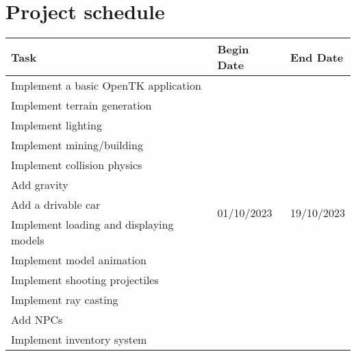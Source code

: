 \section{Project schedule}

\begin{table}[H]
    \begin{tabular}{lll}
        \hline
        \textbf{Task}                                       & \textbf{Begin Date}          & \textbf{End Date}            \\ \hline
        Implement a basic OpenTK application                & \multirow{16}{*}{01/10/2023} & \multirow{16}{*}{19/10/2023} \\
        Implement terrain generation                        &                              &                              \\
        Implement lighting                                  &                              &                              \\
        Implement mining/building                           &                              &                              \\
        Implement collision physics                         &                              &                              \\
        Add gravity                                         &                              &                              \\
        Add a drivable car                                  &                              &                              \\
        Implement loading and displaying models             &                              &                              \\
        Implement model animation                           &                              &                              \\
        Implement shooting projectiles                      &                              &                              \\
        Implement ray casting                               &                              &                              \\
        Add NPCs                                            &                              &                              \\
        Implement inventory system                          &                              &                              \\

\end{tabular}
\end{table}
